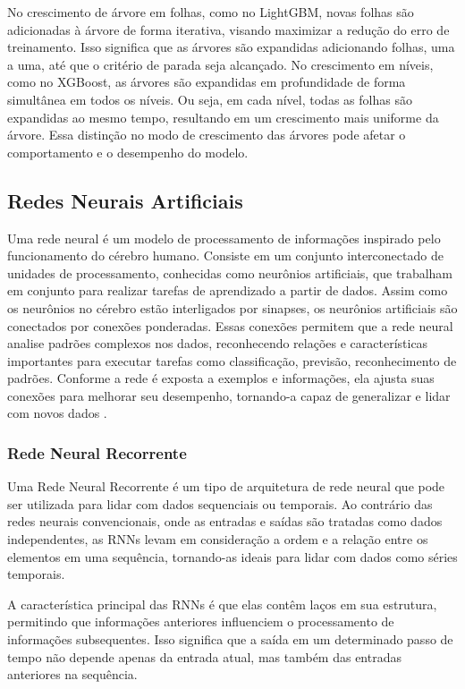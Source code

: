  
 No crescimento de árvore em folhas, como no LightGBM, novas folhas são adicionadas à árvore de forma iterativa, visando maximizar a redução do erro de treinamento. Isso significa que as árvores são expandidas adicionando folhas, uma a uma, até que o critério de parada seja alcançado.
 No crescimento em níveis, como no XGBoost, as árvores são expandidas em profundidade de forma simultânea em todos os níveis. Ou seja, em cada nível, todas as folhas são expandidas ao mesmo tempo, resultando em um crescimento mais uniforme da árvore.
 Essa distinção no modo de crescimento das árvores pode afetar o comportamento e o desempenho do modelo. 
 
 
 \subsection{Redes Neurais Artificiais}
 
 Uma rede neural é um modelo de processamento de informações inspirado pelo funcionamento do cérebro humano. Consiste em um conjunto interconectado de unidades de processamento, conhecidas como neurônios artificiais, que trabalham em conjunto para realizar tarefas de aprendizado a partir de dados. Assim como os neurônios no cérebro estão interligados por sinapses, os neurônios artificiais são conectados por conexões ponderadas. Essas conexões permitem que a rede neural analise padrões complexos nos dados, reconhecendo relações e características importantes para executar tarefas como classificação, previsão, reconhecimento de padrões. Conforme a rede é exposta a exemplos e informações, ela ajusta suas conexões para melhorar seu desempenho, tornando-a capaz de generalizar e lidar com novos dados \cite{silva2003redes}.
 
 \subsubsection{Rede Neural Recorrente}
 
 
 Uma Rede Neural Recorrente é um tipo de arquitetura de rede neural que pode ser utilizada para lidar com dados sequenciais ou temporais. Ao contrário das redes neurais convencionais, onde as entradas e saídas são tratadas como dados independentes, as RNNs levam em consideração a ordem e a relação entre os elementos em uma sequência, tornando-as ideais para lidar com dados como séries temporais.
 
 A característica principal das RNNs é que elas contêm laços em sua estrutura, permitindo que informações anteriores influenciem o processamento de informações subsequentes. Isso significa que a saída em um determinado passo de tempo não depende apenas da entrada atual, mas também das entradas anteriores na sequência.
 

